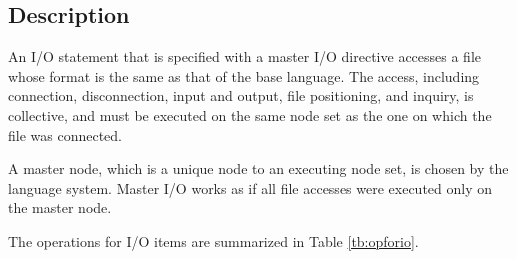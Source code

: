   \subsection*{Description}

   An I/O statement that is specified with a master I/O directive accesses a
   file whose format is the same as that of the base language.
   The access, including connection, disconnection, input and output,
   file positioning, and inquiry, is collective, and must be
   executed on the same node set as the one on which the file was
   connected. 

   A master node, which is a unique node to an executing node set, is chosen by the
   language system.
   Master I/O works as if all file accesses were executed only on the master
   node.

   The operations for I/O items are summarized in Table \ref{tb:opforio}.

